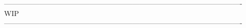 \documentclass{article}
\begin{document}
%
%


%
%




---------------------------------------------------------------------------------------------------- \\
 WIP \\
---------------------------------------------------------------------------------------------------- \\
\end{document}
